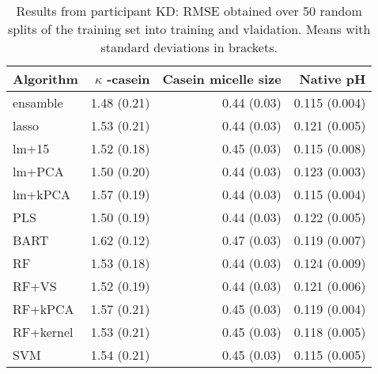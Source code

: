 \begin{table}[h!]
\centering
\begin{tabular}{lrrr}
  \hline

  Algorithm & $\kappa$ -casein & Casein micelle size & Native pH \\ 
  \hline
ensamble & 1.48 (0.21) & 0.44 (0.03) & 0.115 (0.004) \\ 
lasso & 1.53 (0.21) & 0.44 (0.03) & 0.121  (0.005) \\ 
lm+15 & 1.52 (0.18) & 0.45 (0.03) & 0.115  (0.008) \\ 
lm+PCA & 1.50 (0.20) & 0.44 (0.03) & 0.123  (0.003) \\ 
lm+kPCA & 1.57 (0.19) & 0.44 (0.03) & 0.115  (0.004) \\ 
PLS  & 1.50 (0.19) & 0.44 (0.03) & 0.122  (0.005) \\ 
BART & 1.62 (0.12) & 0.47 (0.03) & 0.119 (0.007) \\ 
RF & 1.53 (0.18) & 0.44 (0.03) & 0.124  (0.009) \\ 
RF+VS & 1.52 (0.19) & 0.44 (0.03) & 0.121  (0.006) \\ 
RF+kPCA & 1.57 (0.21) & 0.45 (0.03) & 0.119  (0.004) \\ 
RF+kernel & 1.53 (0.21) & 0.45 (0.03) & 0.118  (0.005) \\ 
SVM & 1.54 (0.21) & 0.45 (0.03) & 0.115  (0.005) \\ 
   \hline
\end{tabular}
\caption{Results from participant KD: RMSE obtained over 50 random splits of the training set into training and vlaidation. Means with standard deviations in brackets.}
\label{table:KD}
\end{table}



